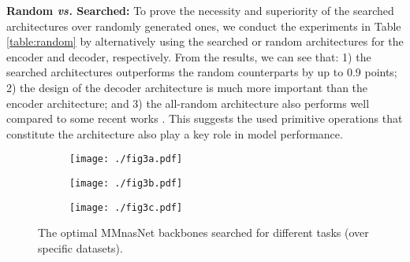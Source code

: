 \documentclass[sigconf]{acmart}
\begin{document}
\noindent\textbf{Random \textit{vs.} Searched:} To prove the necessity and superiority of the searched architectures over randomly generated ones, we conduct the experiments in Table \ref{table:random} by alternatively using the searched or random architectures for the encoder and decoder, respectively. From the results, we can see that: 1) the searched architectures outperforms the random counterparts by up to 0.9 points; 2) the design of the decoder architecture is much more important than the encoder architecture; and 3) the all-random architecture also performs well compared to some recent works \cite{kim2018bilinear, gao2019dynamic}. This suggests the used primitive operations that constitute the architecture also play a key role in model performance.

\captionsetup[subfigure]{font=small}
\begin{figure}
    \centering
    \begin{subfigure}[h]{0.325\columnwidth}
        \texttt{[image: ./fig3a.pdf]}
        \caption{}\label{fig:vqa_arch}
    \end{subfigure}
    \begin{subfigure}[h]{0.325\columnwidth}
        \texttt{[image: ./fig3b.pdf]}
        \caption{}\label{fig:itm_arch}
    \end{subfigure}
    \begin{subfigure}[h]{0.325\columnwidth}
        \texttt{[image: ./fig3c.pdf]}
        \caption{}\label{fig:vg_arch}
    \end{subfigure}
\caption{The optimal MMnasNet backbones searched for different tasks (over specific datasets).}
    \label{fig:mmnasnet_arch}
\end{figure}
\end{document}
